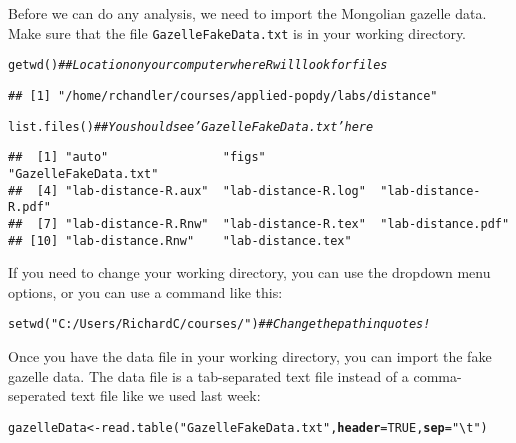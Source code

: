 \documentclass[12pt]{article}\usepackage[]{graphicx}\usepackage[]{color}
\makeatletter
\newcommand{\hlnum}[1]{\textcolor[rgb]{0.69,0.494,0}{#1}}%
\newcommand{\hlstr}[1]{\textcolor[rgb]{0.749,0.012,0.012}{#1}}%
\newcommand{\hlcom}[1]{\textcolor[rgb]{0.514,0.506,0.514}{\textit{#1}}}%
\newcommand{\hlstd}[1]{\textcolor[rgb]{0,0,0}{#1}}%
\newcommand{\hlkwb}[1]{\textcolor[rgb]{0,0.341,0.682}{#1}}%
\newcommand{\hlkwc}[1]{\textcolor[rgb]{0,0,0}{\textbf{#1}}}%
\newcommand{\hlkwd}[1]{\textcolor[rgb]{0.004,0.004,0.506}{#1}}%
\newenvironment{kframe}{%
 \def\at@end@of@kframe{}%
 \ifinner\ifhmode%
  \def\at@end@of@kframe{\end{minipage}}%
  \begin{minipage}{\columnwidth}%
 \fi\fi%
 \def\FrameCommand##1{\hskip\@totalleftmargin \hskip-\fboxsep
 \colorbox{shadecolor}{##1}\hskip-\fboxsep
     \hskip-\linewidth \hskip-\@totalleftmargin \hskip\columnwidth}%
 \MakeFramed {\advance\hsize-\width
   \@totalleftmargin\z@ \linewidth\hsize
   \@setminipage}}%
 {\par\unskip\endMakeFramed%
 \at@end@of@kframe}
\newenvironment{knitrout}{}{} %
\makeatother
\begin{document}
Before we can do any analysis, we need to import the Mongolian gazelle
data. Make sure that the file \texttt{GazelleFakeData.txt} is in your
working directory.

\begin{knitrout}
\color{fgcolor}\begin{kframe}
\begin{alltt}
\hlkwd{getwd}\hlstd{()}       \hlcom{## Location on your computer where R will look for files}
\end{alltt}
\begin{verbatim}
## [1] "/home/rchandler/courses/applied-popdy/labs/distance"
\end{verbatim}
\begin{alltt}
\hlkwd{list.files}\hlstd{()}  \hlcom{## You should see 'GazelleFakeData.txt' here}
\end{alltt}
\begin{verbatim}
##  [1] "auto"                "figs"                "GazelleFakeData.txt"
##  [4] "lab-distance-R.aux"  "lab-distance-R.log"  "lab-distance-R.pdf" 
##  [7] "lab-distance-R.Rnw"  "lab-distance-R.tex"  "lab-distance.pdf"   
## [10] "lab-distance.Rnw"    "lab-distance.tex"
\end{verbatim}
\end{kframe}
\end{knitrout}

If you need to change your working directory, you can use the dropdown
menu options, or you can use a command like this:

\begin{knitrout}
\color{fgcolor}\begin{kframe}
\begin{alltt}
\hlkwd{setwd}\hlstd{(}\hlstr{"C:/Users/RichardC/courses/"}\hlstd{)} \hlcom{## Change the path in quotes!}
\end{alltt}
\end{kframe}
\end{knitrout}

Once you have the data file in your working directory, you can import
the fake gazelle data. The data file is a tab-separated text file
instead of a comma-seperated text file like we used last week:

\begin{knitrout}
\color{fgcolor}\begin{kframe}
\begin{alltt}
\hlstd{gazelleData} \hlkwb{<-} \hlkwd{read.table}\hlstd{(}\hlstr{"GazelleFakeData.txt"}\hlstd{,} \hlkwc{header}\hlstd{=}\hlnum{TRUE}\hlstd{,} \hlkwc{sep}\hlstd{=}\hlstr{"\textbackslash{}t"}\hlstd{)}
\end{alltt}
\end{kframe}
\end{knitrout}
\end{document}
